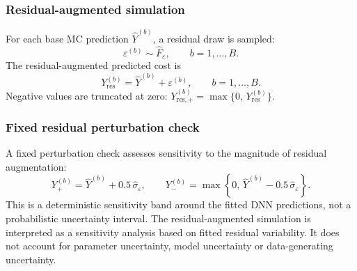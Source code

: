 \subsubsection{Residual-augmented simulation}

For each base MC prediction $\widehat{Y}^{(b)}$, a residual draw is
sampled:
\begin{equation}
    \varepsilon^{(b)}
    \sim
    \widehat{F}_{\varepsilon},
    \qquad
    b=1,\ldots,B.
    \label{eq:residual_draw_ch3}
\end{equation}
The residual-augmented predicted cost is
\begin{equation}
    Y_{\mathrm{res}}^{(b)}
    =
    \widehat{Y}^{(b)}
    +
    \varepsilon^{(b)},
    \qquad
    b=1,\ldots,B.
    \label{eq:residual_augmented_prediction_ch3}
\end{equation}
Negative values are truncated at zero:
$Y_{\mathrm{res},+}^{(b)}
=
\max\{0,\, Y_{\mathrm{res}}^{(b)}\}$.

\subsubsection{Fixed residual perturbation check}

A fixed perturbation check assesses sensitivity to the magnitude of residual
augmentation:
\begin{equation}
    Y_{+}^{(b)}
    =
    \widehat{Y}^{(b)}
    +
    0.5\,\widehat{\sigma}_{\varepsilon},
    \qquad
    Y_{-}^{(b)}
    =
    \max
    \left\{
        0,\,
        \widehat{Y}^{(b)}
        -
        0.5\,\widehat{\sigma}_{\varepsilon}
    \right\}.
    \label{eq:fixed_residual_perturbation_ch3}
\end{equation}
This is a deterministic sensitivity band around the fitted DNN predictions,
not a probabilistic uncertainty interval. The residual-augmented simulation is
interpreted as a sensitivity analysis based on fitted residual variability. It
does not account for parameter uncertainty, model uncertainty or
data-generating uncertainty.

